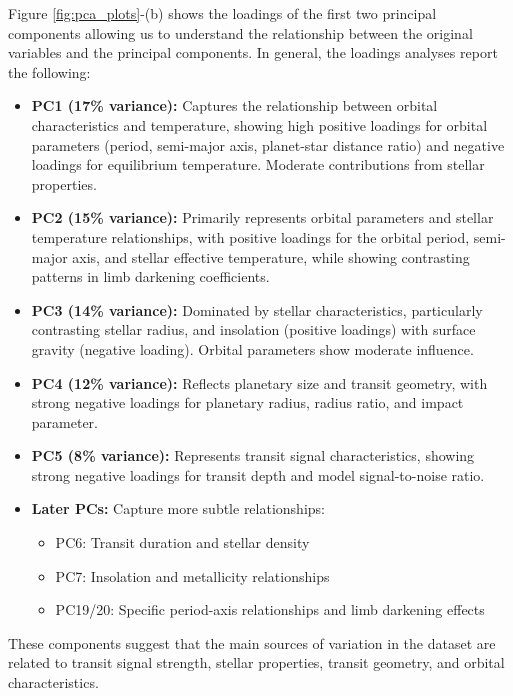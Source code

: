 Figure \ref{fig:pca_plots}-(b) shows the loadings of the first two principal components allowing us to understand the relationship between the original variables and the principal components. In general, the loadings analyses report the following:
\begin{itemize}
    \item \textbf{PC1 (17\% variance):} Captures the relationship between orbital characteristics and temperature, showing high positive loadings for orbital parameters (period, semi-major axis, planet-star distance ratio) and negative loadings for equilibrium temperature. Moderate contributions from stellar properties.
    \item \textbf{PC2 (15\% variance):} Primarily represents orbital parameters and stellar temperature relationships, with positive loadings for the orbital period, semi-major axis, and stellar effective temperature, while showing contrasting patterns in limb darkening coefficients.
    \item \textbf{PC3 (14\% variance):} Dominated by stellar characteristics, particularly contrasting stellar radius, and insolation (positive loadings) with surface gravity (negative loading). Orbital parameters show moderate influence.
    \item \textbf{PC4 (12\% variance):} Reflects planetary size and transit geometry, with strong negative loadings for planetary radius, radius ratio, and impact parameter.
    \item \textbf{PC5 (8\% variance):} Represents transit signal characteristics, showing strong negative loadings for transit depth and model signal-to-noise ratio.
    \item \textbf{Later PCs:} Capture more subtle relationships:
    \begin{itemize}
        \item PC6: Transit duration and stellar density
        \item PC7: Insolation and metallicity relationships
        \item PC19/20: Specific period-axis relationships and limb darkening effects
    \end{itemize}
\end{itemize}

These components suggest that the main sources of variation in the dataset are related to transit signal strength, stellar properties, transit geometry, and orbital characteristics.

